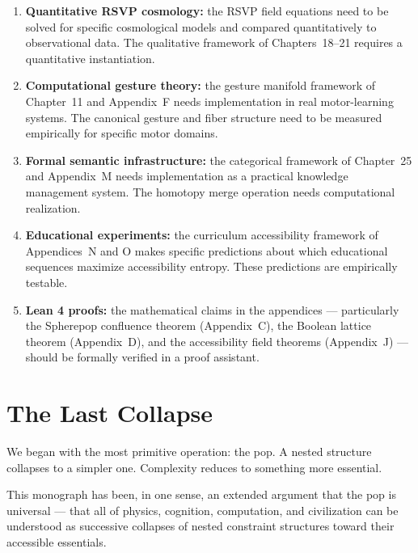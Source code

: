 \begin{enumerate}
  \item \textbf{Quantitative RSVP cosmology:} the RSVP field equations
        need to be solved for specific cosmological models and compared
        quantitatively to observational data. The qualitative framework
        of Chapters~18--21 requires a quantitative instantiation.

  \item \textbf{Computational gesture theory:} the gesture manifold
        framework of Chapter~11 and Appendix~F needs implementation
        in real motor-learning systems. The canonical gesture and
        fiber structure need to be measured empirically for specific
        motor domains.

  \item \textbf{Formal semantic infrastructure:} the categorical
        framework of Chapter~25 and Appendix~M needs implementation
        as a practical knowledge management system. The homotopy
        merge operation needs computational realization.

  \item \textbf{Educational experiments:} the curriculum accessibility
        framework of Appendices~N and O makes specific predictions
        about which educational sequences maximize accessibility
        entropy. These predictions are empirically testable.

  \item \textbf{Lean 4 proofs:} the mathematical claims in the appendices
        — particularly the Spherepop confluence theorem (Appendix~C),
        the Boolean lattice theorem (Appendix~D), and the accessibility
        field theorems (Appendix~J) — should be formally verified in
        a proof assistant.
\end{enumerate}

\section{The Last Collapse}

We began with the most primitive operation: the pop. A nested structure
collapses to a simpler one. Complexity reduces to something more
essential.

This monograph has been, in one sense, an extended argument that the pop
is universal — that all of physics, cognition, computation, and
civilization can be understood as successive collapses of nested
constraint structures toward their accessible essentials.

